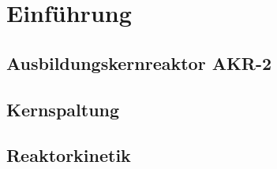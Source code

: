 \section{Einführung}
	\subsection{Ausbildungskernreaktor AKR-2}
	\subsection{Kernspaltung}
	\subsection{Reaktorkinetik}
	
